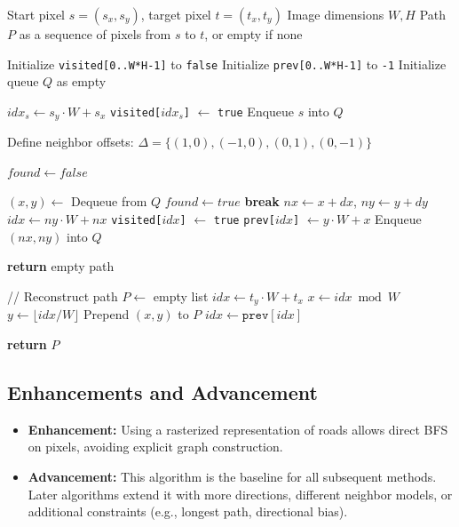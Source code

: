 \documentclass[11pt]{article}
\begin{document}
\begin{algorithm}[h!]
\caption{Pixel-Based Maze Solver (4-Connected BFS)}
\begin{algorithmic}[1]
\Require Start pixel $s = (s_x,s_y)$, target pixel $t = (t_x,t_y)$
\Require Image dimensions $W,H$
\Ensure Path $P$ as a sequence of pixels from $s$ to $t$, or empty if none

\State Initialize \texttt{visited[0..W*H-1]} to \texttt{false}
\State Initialize \texttt{prev[0..W*H-1]} to \texttt{-1}
\State Initialize queue $Q$ as empty

\State $idx_s \gets s_y \cdot W + s_x$
\State \texttt{visited[$idx_s$]} $\gets$ \texttt{true}
\State Enqueue $s$ into $Q$

\State Define neighbor offsets:
\State \hspace{1em} $\Delta = \{(1,0),(-1,0),(0,1),(0,-1)\}$

\State $found \gets false$

  \State $(x,y) \gets$ Dequeue from $Q$
    \State $found \gets true$
    \State \textbf{break}
  \EndIf
    \State $nx \gets x + dx$, $ny \gets y + dy$
      \State $idx \gets ny \cdot W + nx$
        \State \texttt{visited[$idx$]} $\gets$ \texttt{true}
        \State \texttt{prev[$idx$]} $\gets y \cdot W + x$
        \State Enqueue $(nx,ny)$ into $Q$
      \EndIf
    \EndIf
  \EndFor
\EndWhile

  \State \textbf{return} empty path
\EndIf

\State // Reconstruct path
\State $P \gets$ empty list
\State $idx \gets t_y \cdot W + t_x$
  \State $x \gets idx \bmod W$
  \State $y \gets \lfloor idx / W \rfloor$
  \State Prepend $(x,y)$ to $P$
  \State $idx \gets \texttt{prev}[idx]$
\EndWhile

\State \textbf{return} $P$
\end{algorithmic}
\end{algorithm}

\subsection{Enhancements and Advancement}

\begin{itemize}
  \item \textbf{Enhancement:} Using a rasterized representation of roads
  allows direct BFS on pixels, avoiding explicit graph construction.
  \item \textbf{Advancement:} This algorithm is the baseline for all
  subsequent methods. Later algorithms extend it with more directions,
  different neighbor models, or additional constraints (e.g., longest
  path, directional bias).
\end{itemize}
\clearpage
\end{document}
